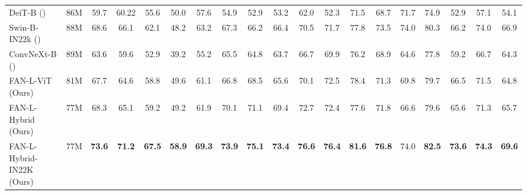 \documentclass[nohyperref]{article}
\theoremstyle{plain}
\theoremstyle{definition}
\theoremstyle{remark}
\begin{document}
\begin{table*}[h]
\begin{savenotes}
\begin{minipage*}{1.0\textwidth}
{\begin{tabular}{l|c|c|cccc|cccc|cccc|cccc}
\multicolumn{1}{l|}{DeiT-B (\citeauthor{touvron2021training})} & 86M & \multicolumn{1}{c|}{59.7 } & 60.22 & 55.6 & 50.0 & \multicolumn{1}{c|}{57.6} & 54.9 & 52.9 & 53.2 & \multicolumn{1}{c|}{62.0} & 52.3 & 71.5 & 68.7 & \multicolumn{1}{c|}{71.7} & 74.9 & {52.9} & 57.1 & {54.1} \\
\multicolumn{1}{l|}{Swin-B-IN22k (\citeauthor{liu2021swin})} & 88M & \multicolumn{1}{c|}{68.6 } & 66.1 & 62.1 & 48.2 & \multicolumn{1}{c|}{63.2} & 67.3 & 66.2 & 66.4 & \multicolumn{1}{c|}{70.5} & 71.7 & 77.8 & 73.5 & \multicolumn{1}{c|}{74.0} & 80.3 & {66.2} & 74.0 & {66.9} \\
\multicolumn{1}{l|}{ConvNeXt-B (\citeauthor{liu2022convnet})} & 89M &  \multicolumn{1}{c|}{63.6 } & 59.6 & 52.9 & 39.2 & 55.2 & \multicolumn{1}{c}{{65.5}} & 64.8 & 63.7 & 66.7 & \multicolumn{1}{c}{69.9} & 76.2 & 68.9 & {64.6} & \multicolumn{1}{c}{77.8} & 59.2 & {66.7} & 64.3  \\
\midrule
\multicolumn{1}{l|}{FAN-L-ViT (Ours)} & 81M & \multicolumn{1}{c|}{{67.7} } &  {64.6} &  {58.8} &  {49.6} & \multicolumn{1}{c|}{ {61.1}} & {66.8} &  {68.5} &  {65.6} & \multicolumn{1}{c|}{ {70.1}} &  {72.5} &  {78.4} &  {71.3} & \multicolumn{1}{c|}{{69.8}} &  {79.7} &  {66.5} &  {71.5} &  {64.8} \\
\multicolumn{1}{l|}{FAN-L-Hybrid (Ours)} & 77M & \multicolumn{1}{c|}{ {68.3} } &  {65.1} &  {59.2} &  {49.2} & \multicolumn{1}{c|}{ {61.9}} & {70.1} &  {71.1} &  {69.4} & \multicolumn{1}{c|}{ {72.7}} &  {72.4} &  {77.6} &  {71.8} & \multicolumn{1}{c|}{{66.6}} &  {79.6} &  {65.6} &  {71.3} &  {65.7} \\
\multicolumn{1}{l|}{FAN-L-Hybrid-IN22K (Ours)} & 77M & \multicolumn{1}{c|}{\textbf{73.6} } & \textbf{71.2} & \textbf{67.5} & \textbf{58.9} & \multicolumn{1}{c|}{\textbf{69.3}} & \textbf{73.9} & \textbf{75.1} & \textbf{73.4} & \multicolumn{1}{c|}{\textbf{76.6}} & \textbf{76.4} & \textbf{81.6} & \textbf{76.8} & \multicolumn{1}{c|}{{74.0}} & \textbf{82.5} & \textbf{73.6} & \textbf{74.3} & \textbf{69.6} \\


\end{tabular}
}
\end{minipage*}
\end{savenotes}
\end{table*} 
\end{document}
